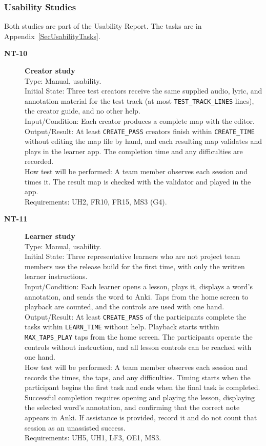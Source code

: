 \documentclass[12pt, titlepage]{article}
\newcommand{\tid}[1]{\hypertarget{test:#1}{\textbf{#1}}}
\newcommand{\cn}[1]{\texttt{#1}}
\begin{document}
\subsubsection{Usability Studies} \label{SecUsabilityTests}

Both studies are part of the Usability Report. The tasks are in
Appendix~\ref{SecUsabilityTasks}.

\begin{description}

\item[\tid{NT-10}] \textbf{Creator study}\\
Type: Manual, usability.\\
Initial State: Three test creators receive the same supplied audio, lyric, and
annotation material for the test track (at most \cn{TEST\_TRACK\_LINES} lines),
the creator guide, and no other help.\\
Input/Condition: Each creator produces a complete map with the editor.\\
Output/Result: At least \cn{CREATE\_PASS} creators finish within
\cn{CREATE\_TIME} without editing the map file by hand, and each resulting map
validates and plays in the learner app. The completion time and any difficulties
are recorded.\\
How test will be performed: A team member observes each session and times it.
The result map is checked with the validator and played in the app.\\
Requirements: UH2, FR10, FR15, MS3 (G4).

\item[\tid{NT-11}] \textbf{Learner study}\\
Type: Manual, usability.\\
Initial State: Three representative learners who are not project team
members use the release build for the first time, with only the written
learner instructions.\\
Input/Condition: Each learner opens a lesson, plays it, displays a word's
annotation, and sends the word to Anki. Taps from the home screen to playback
are counted, and the controls are used with one hand.\\
Output/Result: At least \cn{CREATE\_PASS} of the participants complete the tasks
within \cn{LEARN\_TIME} without help. Playback starts within \cn{MAX\_TAPS\_PLAY}
taps from the home screen. The participants operate the controls without
instruction, and all lesson controls can be reached with one hand.\\
How test will be performed: A team member observes each session and records the
times, the taps, and any difficulties. Timing starts when the participant
begins the first task and ends when the final task is completed.
Successful completion requires opening and playing the lesson,
displaying the selected word's annotation, and confirming that the
correct note appears in Anki. If assistance is provided, record it and
do not count that session as an unassisted success.\\
Requirements: UH5, UH1, LF3, OE1, MS3.

\end{description}
\end{document}
